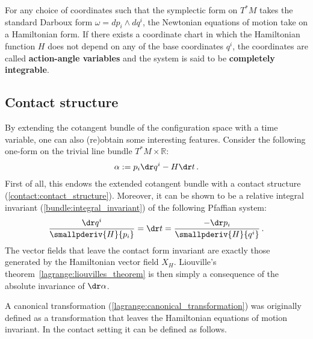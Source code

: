     For any choice of coordinates such that the symplectic form on $T^*M$ takes the standard Darboux form $\omega=dp_i\wedge dq^i$, the Newtonian equations of motion take on a Hamiltonian form. If there exists a coordinate chart in which the Hamiltonian function $H$ does not depend on any of the base coordinates $q^i$, the coordinates are called \textbf{action-angle variables} and the system is said to be \textbf{completely integrable}.

\subsection{Contact structure}

    By extending the cotangent bundle of the configuration space with a time variable, one can also (re)obtain some interesting features. Consider the following one-form on the trivial line bundle $T^*M\times\mathbb{R}$:
    \begin{gather}
        \alpha := p_i\dr q^i - H\dr t\,.
    \end{gather}
    First of all, this endows the extended cotangent bundle with a contact structure (\cref{contact:contact_structure}). Moreover, it can be shown to be a relative integral invariant (\cref{bundle:integral_invariant}) of the following Pfaffian system:
    \begin{gather}
        \frac{\dr q^i}{\smallpderiv{H}{p_i}} = \dr t = \frac{-\dr p_i}{\smallpderiv{H}{q^i}}\,.
    \end{gather}
    The vector fields that leave the contact form invariant are exactly those generated by the Hamiltonian vector field $X_H$. Liouville's theorem~\ref{lagrange:liouvilles_theorem} is then simply a consequence of the absolute invariance of $\dr\alpha$.

    A canonical transformation (\cref{lagrange:canonical_transformation}) was originally defined as a transformation that leaves the Hamiltonian equations of motion invariant. In the contact setting it can be defined as follows.


